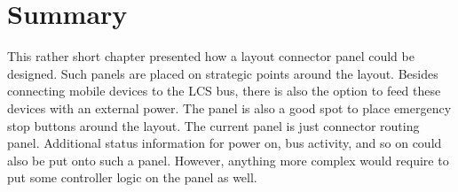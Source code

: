 
\section{Summary}

This rather short chapter presented how a layout connector panel could be designed. Such panels are placed on strategic points around the layout. Besides connecting mobile devices to the LCS bus, there is also the option to feed these devices with an external power.  The panel is also a good spot to place emergency stop buttons around the layout.  The current panel is just connector routing panel.  Additional status information for power on, bus activity, and so on could also be put onto such a panel. However, anything more complex would require to put some controller logic on the panel as well.

